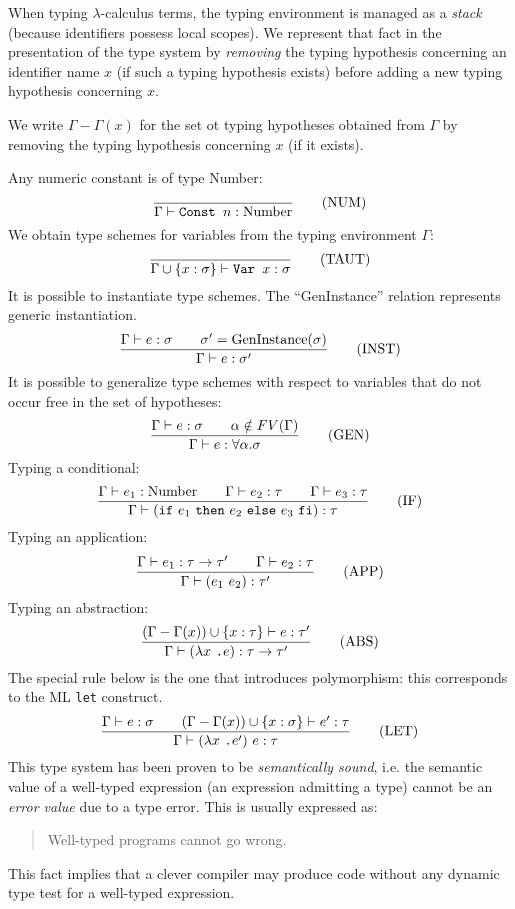 When typing $\lambda$-calculus terms, the typing environment is
managed as a {\em stack} (because identifiers possess local scopes).
We represent that fact in the presentation of the type system by {\em
removing} the typing hypothesis concerning an identifier name $x$ (if
such a typing hypothesis exists) before adding a new typing hypothesis
concerning $x$.

We write $\Gamma-\Gamma(x)$ for the set ot typing hypotheses obtained from
$\Gamma$ by removing the typing hypothesis concerning $x$ (if it exists).

%
\par\noindent
Any numeric constant is of type Number:
\[
\frac{}
{\Gamma \vdash \mbox{\tt Const } n : \mbox{Number}}\mbox{\qquad(NUM)}
\]
We obtain type schemes for variables from the typing environment 
$\Gamma$:
\[
\frac{}
{\Gamma \cup \{x:\sigma\} \vdash \mbox{\tt Var }x:\sigma}\mbox{\qquad(TAUT)}
\]
It is possible to instantiate type schemes.
The ``GenInstance'' relation represents generic instantiation.
\[
\frac{\Gamma \vdash e:\sigma\qquad \sigma' = \mbox{GenInstance}(\sigma)}
{\Gamma \vdash e:\sigma'}\mbox{\qquad(INST)}
\]
It is possible to generalize type schemes with respect to variables that do
not occur free in the set of hypotheses:
\[
\frac{ \Gamma \vdash e:\sigma \qquad \alpha \notin FV(\Gamma)}
{\Gamma  \vdash e:\forall \alpha . \sigma}\mbox{\qquad(GEN)}
\]
Typing a conditional:
\[\frac{\Gamma \vdash e_1:\mbox{Number} \qquad
      \Gamma \vdash e_2:\tau \qquad
      \Gamma \vdash e_3:\tau}
{\Gamma \vdash (\mbox{\tt if}~ e_1 ~\mbox{\tt then}~e_2~
             \mbox{\tt else}~ e_3~\mbox{\tt fi}) : \tau}\mbox{\qquad(IF)}
\]
Typing an application:
\[
\frac{\Gamma \vdash e_1: \tau \rightarrow \tau' \qquad
      \Gamma \vdash e_2: \tau}
{        \Gamma \vdash (e_1~e_2) : \tau'}\mbox{\qquad(APP)}
\]
Typing an abstraction:
\[
\frac{(\Gamma-\Gamma(x)) \cup \{x:\tau\} \vdash e : \tau'}
{\Gamma \vdash (\lambda  x~ \mbox{\tt .} e) : \tau \rightarrow \tau'}\mbox{\qquad(ABS)}
\]
%
The special rule below is the one that introduces polymorphism: this
corresponds to the ML {\tt let} construct.
\[
\frac{\Gamma \vdash e:\sigma\qquad
      (\Gamma-\Gamma(x)) \cup \{x:\sigma\}
                  \vdash e':\tau}
{\Gamma \vdash (\lambda  x~ \mbox{\tt .} e')~ e : \tau}\mbox{\qquad(LET)}
\]
%
This type system has been proven to be {\em semantically sound}, i.e.
the semantic value of a well-typed expression (an expression admitting a
type) cannot be an {\em error value} due to a type error. This is usually expressed as:
\begin{quote}
Well-typed programs cannot go wrong.
\end{quote}
This fact implies that a clever compiler may produce code without any
dynamic type test for a well-typed expression.

